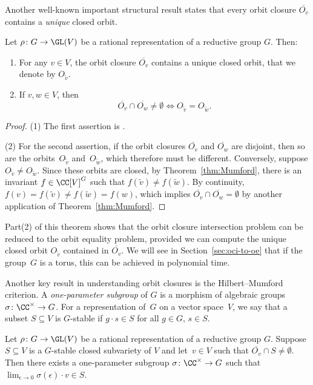 Another well-known important structural result states that every orbit closure $\overline{O_v}$ contains a {\em unique} closed orbit.

\begin{theorem}\label{th:uniqueclosedorbit}
Let $\rho\colon G \rightarrow \GL(V)$ be a rational representation of a reductive group $G$. Then:
\begin{enumerate}
\item For any $v\in V$, the orbit closure $\overline{O_v}$ contains a unique closed orbit, that we denote by $O_{\widetilde{v}}$.
\item\label{it:oci red} If $v,w \in V$, then
\[
\overline{O_v} \cap \overline{O_w} \ne \emptyset \Longleftrightarrow O_{\widetilde{v}} = O_{\widetilde{w}}.
\]
\end{enumerate}
\end{theorem}
\begin{proof}
(1) The first assertion is \cite[Theorem~2.3.6]{DK}.

(2) For the second assertion, if the orbit closures $\overline{O_v}$ and $\overline{O_w}$ are disjoint, then so are the orbits~$O_{\widetilde{v}}$ and~$O_{\widetilde{w}}$, which therefore must be different.
Conversely, suppose $O_{\widetilde{v}} \neq O_{\widetilde{w}}$.
Since these orbits are closed, by Theorem~\ref{thm:Mumford},
there is an invariant $f \in \CC[V]^G$ such that $f(\widetilde{v}) \neq f(\widetilde{w})$.
By continuity, $f(v) = f(\widetilde{v}) \neq f(\widetilde{w}) = f(w)$, which implies $\overline{O_v} \cap \overline{O_w} = \emptyset$ by another application of Theorem~\ref{thm:Mumford}.
\end{proof}

Part(2) of this theorem shows that the orbit closure intersection problem can be reduced to the orbit equality problem,
provided we can compute the unique closed orbit $O_{\widetilde{v}}$ contained in $\overline{O_v}$.
We will see in Section~\ref{sec:oci-to-oe} that if the group~$G$ is a torus, this can be achieved in polynomial time.

Another key result in understanding orbit closures is the Hilbert--Mumford criterion.
A {\em one-parameter subgroup} of $G$ is a morphism of algebraic groups $\sigma \colon \CC^\times \rightarrow G$.
For a representation of~$G$ on a vector space~$V$, we say that a subset $S \subseteq V$ is $G$-stable if $g \cdot s \in S$ for all $g \in G$, $s \in S$.
%

%

\begin{theorem}\label{th:HM-crit}
Let $\rho \colon G \rightarrow \GL(V)$ be a rational representation of a reductive group $G$.
Suppose $S \subseteq V$ is a $G$-stable closed subvariety of $V$ and let~$v \in V$ such that $\overline{O_v} \cap S \neq \emptyset$.
Then there exists a one-parameter subgroup $\sigma \colon \CC^\times \rightarrow G$ such that $\lim_{\epsilon \to 0} \sigma(\epsilon) \cdot v \in S$.
\end{theorem}

